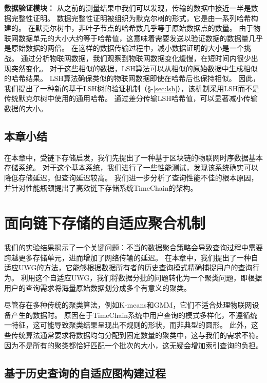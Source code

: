 \textbf{数据验证模块：}
从之前的测量结果中我们可以发现，传输的数据中接近一半是数据完整性证明。
数据完整性证明被组织为默克尔树的形式，它是由一系列哈希构建的。
在默克尔树中，非叶子节点的哈希数几乎等于原始数据点的数量。
由于物联网数据单元的大小大约等于哈希值，这意味着需要发送以验证数据的数据量几乎是原始数据的两倍。
在这样的数据传输过程中，减小数据证明的大小是一个挑战。
通过分析物联网数据，我们观察到物联网数据变化缓慢，在短时间内很少出现突然变化。
对于这些相似的数据，LSH算法可以从相似的原始数据中生成相似的哈希结果。
LSH算法确保类似的物联网数据即使在哈希后也保持相似。
因此，我们提出了一种新的基于LSH树的验证机制（§-\ref{sec:lsh}），该机制采用LSH而不是传统默克尔树中使用的通用哈希。
通过差分传输LSH哈希值，可以显著减小传输数据的大小。

\section{本章小结}
在本章中，受链下存储启发，我们先提出了一种基于区块链的物联网时序数据基本存储系统。
对于这个基本系统，我们进行了一些性能测试，发现该系统确实可以降低存储延迟，但查询延迟较高。
我们进一步分析了查询性能不佳的根本原因，并针对性能瓶颈提出了高效链下存储系统TimeChain的架构。

\chapter{面向链下存储的自适应聚合机制}
\label{sec:packaging}
我们的实验结果揭示了一个关键问题：不当的数据聚合策略会导致查询过程中需要跨越更多存储单元，进而增加了网络传输的延迟。
在本章中，我们提出了一种自适应UWG的方法，它能够根据数据所有者的历史查询模式精确捕捉用户的查询行为。
利用这个自适应UWG，我们将数据分批的问题转化为一个聚类问题，即根据用户的查询需求将海量原始数据划分成多个有意义的聚类。

尽管存在多种传统的聚类算法，例如K-means和GMM，它们不适合处理物联网设备产生的数据时。
原因在于TimeChain系统中用户查询的模式多样化，不遵循统一特征，这可能导致聚类结果呈现出不规则的形状，而非典型的圆形。
此外，这些传统算法通常要求将数据均匀分配到固定数量的聚类中，这与我们的需求不符。
因为不是所有的聚类都恰好匹配一个批次的大小，这无疑会增加索引查询的负担。

\section{基于历史查询的自适应图构建过程}
\label{sec:UWG}

